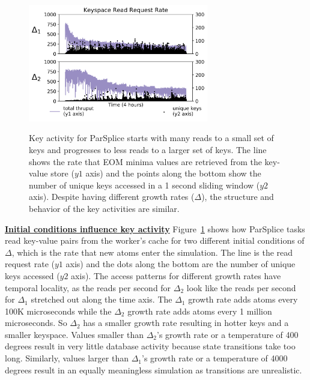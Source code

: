 \begin{figure}[t]
  \centering
  \includegraphics[width=0.7\textwidth]{./chapters/controlplane/parsplice/figures/motivation-regimes.png}\\
  \caption{Key activity for ParSplice starts with many reads to a small set of
keys and progresses to less reads to a larger set of keys.  The line shows the
rate that EOM minima values are retrieved from the key-value store (\(y1\)
axis) and the points along the bottom show the number of unique keys accessed in a 1
second sliding window (\(y2\) axis). Despite having different growth rates
(\(\Delta\)), the structure and behavior of the key activities are similar.
\label{fig:motivation-regimes}}
\end{figure}

\textbf{\underline{Initial conditions influence key activity}}
Figure~\ref{fig:motivation-regimes} shows how ParSplice tasks read key-value
pairs from the worker's cache for two different initial conditions of
\(\Delta\), which is the rate that new atoms enter the simulation.  The line is
the read request rate (\(y1\) axis) and the dots along the bottom are the
number of unique keys accessed (\(y2\) axis).  The access patterns for
different growth rates have temporal locality, as the reads per second for
\(\Delta_2\) look like the reads per second for \(\Delta_1\) stretched out
along the time axis.  The \(\Delta_1\) growth rate adds atoms every 100K
microseconds while the \(\Delta_2\) growth rate adds atoms every 1 million
microseconds. So \(\Delta_2\) has a smaller growth rate resulting in hotter
keys and a smaller keyspace.  Values smaller than \(\Delta_2\)'s growth rate or
a temperature of 400 degrees result in very little database activity because
state transitions take too long. Similarly, values larger than \(\Delta_1\)'s
growth rate or a temperature of 4000 degrees result in an equally meaningless
simulation as transitions are unrealistic.  

